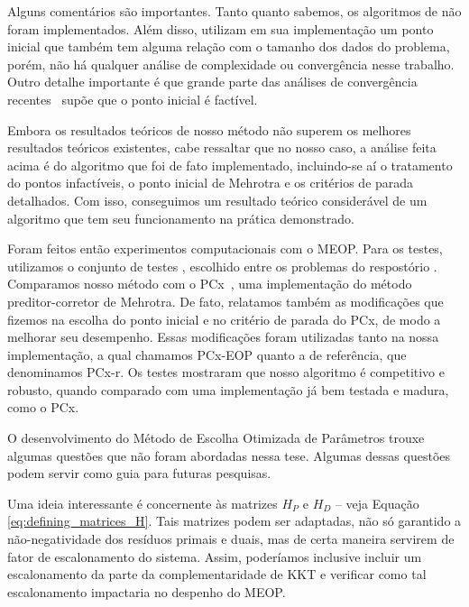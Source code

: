 Alguns  comentários são importantes. Tanto quanto sabemos, os algoritmos de \textcite{Zhang:1996it,Zhang:2006ic,Wright:1996kj} não foram implementados. Além disso, \textcite{Gertz:2003ji} utilizam em sua implementação um ponto inicial que também tem alguma relação com o tamanho dos dados do problema, porém, não há qualquer análise de complexidade ou convergência nesse trabalho. Outro detalhe importante é que  grande parte das análises de convergência recentes~\cite{Gondzio:2011ta} supõe que o ponto inicial é factível. 

Embora os resultados teóricos de nosso método  não superem os melhores resultados teóricos existentes, cabe ressaltar que no nosso caso, a análise feita acima é do algoritmo que foi de fato implementado, incluindo-se aí o tratamento do pontos infactíveis, o ponto inicial de Mehrotra e os critérios de parada detalhados. Com isso, conseguimos um resultado teórico considerável de um algoritmo que tem seu funcionamento na prática demonstrado.



Foram feitos então experimentos computacionais com o MEOP.  Para os testes, utilizamos o conjunto de testes , escolhido entre os problemas do respostório \Netlib. Comparamos nosso método com o PCx~\cite{Czyzyk:1999hk}, uma implementação do método preditor-corretor de Mehrotra. De fato, relatamos também as modificações que fizemos na escolha do ponto inicial e no critério de parada do PCx, de modo a melhorar seu desempenho. Essas modificações foram utilizadas tanto na nossa implementação, a qual chamamos PCx-EOP quanto a de referência, que denominamos PCx-r. Os testes mostraram que nosso algoritmo é competitivo e robusto, quando comparado com uma implementação já bem testada e madura, como o PCx. 





O desenvolvimento do Método de Escolha Otimizada de Parâmetros trouxe algumas questões que 
não foram  abordadas nessa tese. Algumas dessas questões podem servir como guia para futuras pesquisas.

Uma ideia interessante é concernente às matrizes $H_P$ e $H_D$  -- veja Equação
\eqref{eq:defining_matrices_H}. Tais matrizes podem ser adaptadas, não só garantido a
não-negatividade dos resíduos primais e duais, mas de certa maneira servirem de  fator de escalonamento do sistema. Assim, poderíamos inclusive incluir um escalonamento da parte da complementaridade de KKT e verificar como tal escalonamento impactaria no despenho do MEOP.


